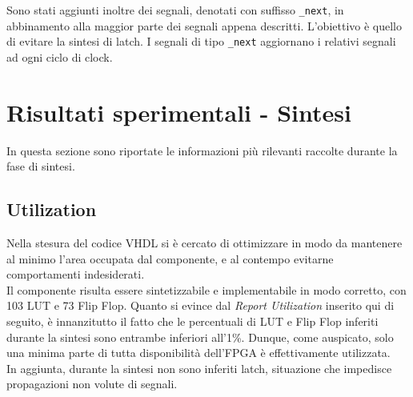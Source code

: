 \documentclass{article}
\begin{document}
\vspace{0,6cm}
Sono stati aggiunti inoltre dei segnali, denotati con suffisso \verb^_next^, in abbinamento alla maggior parte dei segnali appena descritti. L'obiettivo è quello di evitare la sintesi di latch. I segnali di tipo \verb^_next^ aggiornano i relativi segnali ad ogni ciclo di clock.


\newpage
\section{Risultati sperimentali - Sintesi}
In questa sezione sono riportate le informazioni più rilevanti raccolte durante la fase di sintesi.
\subsection{Utilization}
Nella stesura del codice VHDL si è cercato di ottimizzare in modo da mantenere al minimo l'area occupata dal componente, e al contempo evitarne comportamenti indesiderati.
\\Il componente risulta essere sintetizzabile e implementabile in modo corretto, con 103 LUT e 73 Flip Flop.
Quanto si evince dal \emph{Report Utilization} inserito qui di seguito, è innanzitutto il fatto che le percentuali di LUT e Flip Flop inferiti durante la sintesi sono entrambe inferiori all'1\%.
Dunque, come auspicato, solo una minima parte di tutta disponibilità dell'FPGA è effettivamente utilizzata.
\\In aggiunta, durante la sintesi non sono inferiti latch, situazione che impedisce propagazioni non volute di segnali.
\end{document}
